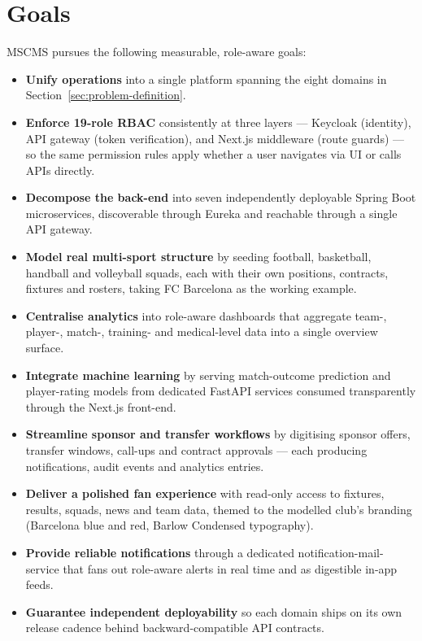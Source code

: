 \documentclass[12pt,a4paper,oneside]{report}
\begin{document}
\section{Goals}
\label{sec:goals}
MSCMS pursues the following measurable, role-aware goals:

\begin{itemize}[leftmargin=*]
  \item \textbf{Unify operations} into a single platform spanning the
        eight domains in Section~\ref{sec:problem-definition}.
  \item \textbf{Enforce 19-role RBAC} consistently at three layers ---
        Keycloak (identity), API gateway (token verification), and
        Next.js middleware (route guards) --- so the same permission
        rules apply whether a user navigates via UI or calls APIs
        directly.
  \item \textbf{Decompose the back-end} into seven independently
        deployable Spring Boot microservices, discoverable through
        Eureka and reachable through a single API gateway.
  \item \textbf{Model real multi-sport structure} by seeding football,
        basketball, handball and volleyball squads, each with their own
        positions, contracts, fixtures and rosters, taking FC Barcelona
        as the working example.
  \item \textbf{Centralise analytics} into role-aware dashboards that
        aggregate team-, player-, match-, training- and medical-level
        data into a single overview surface.
  \item \textbf{Integrate machine learning} by serving match-outcome
        prediction and player-rating models from dedicated FastAPI
        services consumed transparently through the Next.js front-end.
  \item \textbf{Streamline sponsor and transfer workflows} by
        digitising sponsor offers, transfer windows, call-ups and
        contract approvals --- each producing notifications, audit
        events and analytics entries.
  \item \textbf{Deliver a polished fan experience} with read-only
        access to fixtures, results, squads, news and team data,
        themed to the modelled club's branding (Barcelona blue and red,
        Barlow Condensed typography).
  \item \textbf{Provide reliable notifications} through a dedicated
        notification-mail-service that fans out role-aware alerts in
        real time and as digestible in-app feeds.
  \item \textbf{Guarantee independent deployability} so each domain
        ships on its own release cadence behind backward-compatible
        API contracts.
\end{itemize}
\end{document}
